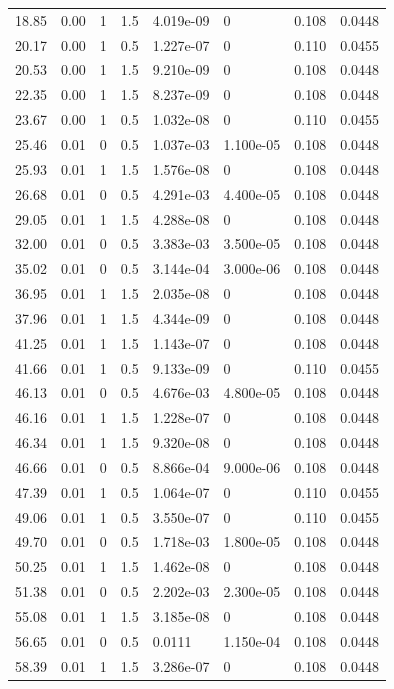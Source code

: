 \documentclass[preview]{standalone}
\begin{document}
{{\begin{tabular}{L{1.2cm}C{1.2cm} C{0.3cm}C{0.5cm} C{1.4cm}C{1.4cm} C{1.4cm}C{1.4cm}}
  18.85  &  0.00  & 1     & 1.5 &  4.019e-09  & 0  & 0.108 &  0.0448   \\ 
  20.17  &  0.00  & 1     & 0.5 &  1.227e-07  & 0  & 0.110 &  0.0455   \\ 
  20.53  &  0.00  & 1     & 1.5 &  9.210e-09  & 0  & 0.108 &  0.0448   \\ 
  22.35  &  0.00  & 1     & 1.5 &  8.237e-09  & 0  & 0.108 &  0.0448   \\ 
  23.67  &  0.00  & 1     & 0.5 &  1.032e-08  & 0  & 0.110 &  0.0455   \\ 
  25.46  &  0.01  & 0     & 0.5 &  1.037e-03  & 1.100e-05  & 0.108 &  0.0448   \\ 
  25.93  &  0.01  & 1     & 1.5 &  1.576e-08  & 0  & 0.108 &  0.0448   \\ 
  26.68  &  0.01  & 0     & 0.5 &  4.291e-03  & 4.400e-05  & 0.108 &  0.0448   \\ 
  29.05  &  0.01  & 1     & 1.5 &  4.288e-08  & 0  & 0.108 &  0.0448   \\ 
  32.00  &  0.01  & 0     & 0.5 &  3.383e-03  & 3.500e-05  & 0.108 &  0.0448   \\ 
  35.02  &  0.01  & 0     & 0.5 &  3.144e-04  & 3.000e-06  & 0.108 &  0.0448   \\ 
  36.95  &  0.01  & 1     & 1.5 &  2.035e-08  & 0  & 0.108 &  0.0448   \\ 
  37.96  &  0.01  & 1     & 1.5 &  4.344e-09  & 0  & 0.108 &  0.0448   \\ 
  41.25  &  0.01  & 1     & 1.5 &  1.143e-07  & 0  & 0.108 &  0.0448   \\ 
  41.66  &  0.01  & 1     & 0.5 &  9.133e-09  & 0  & 0.110 &  0.0455   \\ 
  46.13  &  0.01  & 0     & 0.5 &  4.676e-03  & 4.800e-05  & 0.108 &  0.0448   \\ 
  46.16  &  0.01  & 1     & 1.5 &  1.228e-07  & 0  & 0.108 &  0.0448   \\ 
  46.34  &  0.01  & 1     & 1.5 &  9.320e-08  & 0  & 0.108 &  0.0448   \\ 
  46.66  &  0.01  & 0     & 0.5 &  8.866e-04  & 9.000e-06  & 0.108 &  0.0448   \\ 
  47.39  &  0.01  & 1     & 0.5 &  1.064e-07  & 0  & 0.110 &  0.0455   \\ 
  49.06  &  0.01  & 1     & 0.5 &  3.550e-07  & 0  & 0.110 &  0.0455   \\ 
  49.70  &  0.01  & 0     & 0.5 &  1.718e-03  & 1.800e-05  & 0.108 &  0.0448   \\ 
  50.25  &  0.01  & 1     & 1.5 &  1.462e-08  & 0  & 0.108 &  0.0448   \\ 
  51.38  &  0.01  & 0     & 0.5 &  2.202e-03  & 2.300e-05  & 0.108 &  0.0448   \\ 
  55.08  &  0.01  & 1     & 1.5 &  3.185e-08  & 0  & 0.108 &  0.0448   \\ 
  56.65  &  0.01  & 0     & 0.5 &  0.0111  & 1.150e-04  & 0.108 &  0.0448   \\ 
  58.39  &  0.01  & 1     & 1.5 &  3.286e-07  & 0  & 0.108 &  0.0448   \\ 
\hline 
\end{tabular} 

}}
\end{document}
